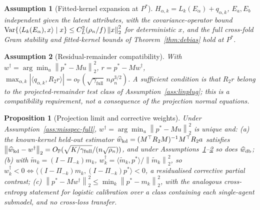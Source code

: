 \documentclass[12pt]{article}
\newtheorem{proposition}{Proposition}
\newtheorem{assumption}{Assumption}
\newcommand{\1}{\mathbf{1}}
\newcommand{\norm}[1]{\left\lVert#1\right\rVert}
\begin{document}
\begin{assumption}[Fitted-kernel expansion at $P^\ast$]
\label{ass:misspec-fitted}
$H_{\alpha,k}=L_k(E_\alpha)+q_{\alpha,k}$, $E_a,E_b$ independent given the latent attributes, with
the covariance-operator bound ${\rm Var}\{\langle L_k(E_\alpha),x\rangle\mid x\}\le
C_L^2(\rho_n/f)\norm{x}_2^2$ for deterministic $x$, and the full cross-fold Gram stability and
fitted-kernel bounds of Theorem~\ref{thm:debias} hold at $P^\ast$.
\end{assumption}

\begin{assumption}[Residual-remainder compatibility]
\label{ass:misspec-residual-compatibility}
With $w^\dagger=\arg\min_u\norm{p^\ast-Mu}_2^2$, $r=p^\ast-Mw^\dagger$, $\max_{\alpha,k}|\langle
q_{\alpha,k},R_2r\rangle|=o_{\mathbb P}(\sqrt{\gamma_{\mathrm{full}}}\,n\rho_n^{3/2})$. A sufficient
condition is that $R_2r$ belong to the projected-remainder test class of
Assumption~\ref{ass:linplug}; this is a compatibility requirement, not a consequence of the
projection normal equations.
\end{assumption}

\begin{proposition}[Projection limit and corrective weights]
\label{prop:mis-cor}
Under Assumption~\ref{ass:misspec-full}, $w^\dagger=\arg\min_u\norm{p^\ast-Mu}_2^2$ is unique
and: \textup{(a)} the known-kernel held-out estimator $\widehat w_{\rm kd}=(M^\top R_2M)^{-1}M^\top
R_2a$ satisfies $\norm{\widehat w_{\rm kd}-w^\dagger}_2=O_{\mathbb P}(\sqrt{K/\gamma_{\mathrm{full}}}/(n\sqrt{\rho_n}))$, and under Assumptions~\ref{ass:misspec-fitted}--\ref{ass:misspec-residual-compatibility}
so does $\widehat w_{\rm db}$; \textup{(b)} with $\widetilde m_k=(I-\Pi_{-k})m_k$, $w^\dagger_k=\langle\widetilde
m_k,p^\ast\rangle/\norm{\widetilde m_k}_2^2$, so $w^\dagger_k<0\iff\langle(I-\Pi_{-k})m_k,(I-\Pi_{-k})p^\ast\rangle<0$,
a residualised corrective partial contrast; \textup{(c)} $\norm{p^\ast-Mw^\dagger}_2^2\le\min_k\norm{p^\ast-m_k}_2^2$,
with the analogous cross-entropy statement for logistic calibration over a class containing each
single-agent submodel, and no cross-loss transfer.
\end{proposition}
\end{document}
